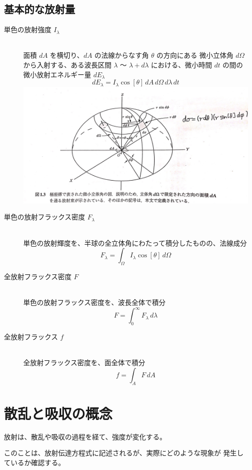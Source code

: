 \documentclass[article,nontitlepage,]{dennou777}
\begin{document}
\subsection{基本的な放射量}
\begin{description}
	\item[単色の放射強度 $I_\lambda$]\leavevmode\\
		面積 $dA$ を横切り、$dA$ の法線からなす角 $\theta$ の方向にある
		微小立体角 $d\Omega$ から入射する、ある波長区間 $\lambda$ 〜
		$\lambda+d\lambda$ における、微小時間 $dt$ の間の微小放射エネルギー量
		$dE_\lambda$
		\[dE_\lambda=I_\lambda\cos[\theta]\,dA\,d\Omega\,d\lambda\,dt\]
		\includegraphics[width=\linewidth]{eq.jpg}
\end{description}

\begin{description}
	\item[単色の放射フラックス密度 $F_\lambda$]\leavevmode\\
		単色の放射輝度を、半球の全立体角にわたって積分したものの、法線成分
		\[F_\lambda=\int_\Omega I_\lambda\cos[\theta]\,d\Omega\]
	\item[全放射フラックス密度 $F$]\leavevmode\\
		単色の放射フラックス密度を、波長全体で積分
		\[F=\int^\infty_0 F_\lambda\,d\lambda\]
	\item[全放射フラックス $f$]\leavevmode\\
		全放射フラックス密度を、面全体で積分
		\[f=\int_AF\,dA\]
\end{description}

\section{散乱と吸収の概念}
放射は、散乱や吸収の過程を経て、強度が変化する。

このことは、放射伝達方程式に記述されるが、実際にどのような現象が
発生しているか確認する。
\end{document}
